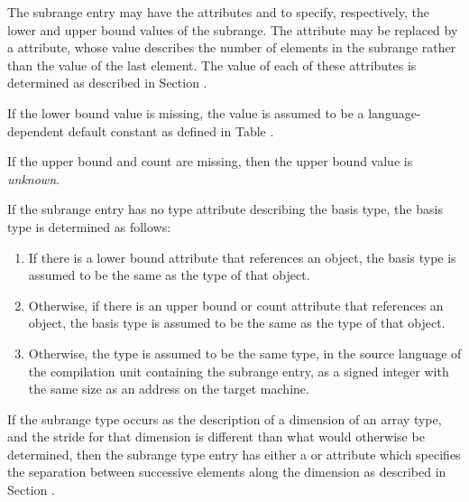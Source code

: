 The\hypertarget{chap:DWATlowerboundlowerboundofsubrange}{}
subrange\hypertarget{chap:DWATupperboundupperboundofsubrange}{}
entry may have the attributes
\DWATlowerboundDEFN{}
and \DWATupperboundDEFN{}
 to specify, respectively, the lower
and upper bound values of the subrange. The
\DWATupperboundNAME{}
attribute\hypertarget{chap:DWATcountelementsofsubrangetype}{}
may be replaced by a
\DWATcountDEFN{} attribute,
whose value describes the number of elements in the subrange
rather than the value of the last element. The value of each
of these attributes is determined as described in
Section .

If the lower bound value is missing, the value is assumed to
be a language-dependent default constant as defined in
Table .

If the upper bound and count are missing, then the upper bound value is
\textit{unknown}.

If the subrange entry has no type attribute describing the
basis type, the basis type is determined as follows:
\begin{enumerate}[1. ]
\item
If there is a lower bound attribute that references an object,
the basis type is assumed to be the same as the type of that object.
\item
Otherwise, if there is an upper bound or count attribute that references
an object, the basis type is assumed to be the same as the type of that object.
\item
Otherwise, the type is
assumed to be the same type, in the source language of the
compilation unit containing the subrange entry, as a signed
integer with the same size as an address on the target machine.
\end{enumerate}

If the subrange type occurs as the description of a dimension
of an array type, and the stride for that dimension
is\hypertarget{chap:DWATbytestridesubrangestridedimensionofarraytype}{}
different than what would otherwise be determined,
then\hypertarget{chap:DWATbitstridesubrangestridedimensionofarraytype}{}
the subrange type entry has either a
\DWATbytestrideDEFN{} or
\DWATbitstrideDEFN{} attribute
which specifies the separation
between successive elements along the dimension as described in
Section .

